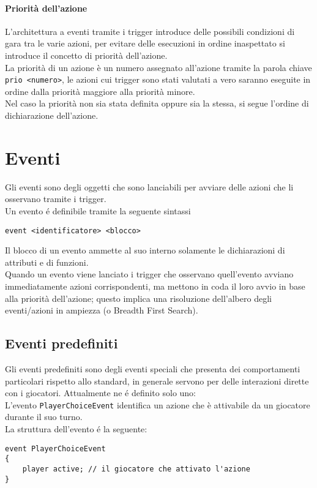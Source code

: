 \paragraph{Priorità dell'azione}
L'architettura a eventi tramite i trigger introduce delle possibili condizioni di gara tra le varie azioni,
per evitare delle esecuzioni in ordine inaspettato si introduce il concetto di priorità dell'azione. \\
La priorità di un azione è un numero assegnato all'azione tramite la parola chiave \verb|prio <numero>|,
le azioni cui trigger sono stati valutati a vero saranno eseguite in ordine dalla priorità maggiore
alla priorità minore. \\
Nel caso la priorità non sia stata definita oppure sia la stessa, si segue l'ordine di dichiarazione dell'azione.

\section{Eventi}
Gli eventi sono degli oggetti che sono lanciabili per avviare delle azioni che li osservano tramite i trigger. \\
Un evento é definibile tramite la seguente sintassi
\begin{lstlisting}
event <identificatore> <blocco>
\end{lstlisting}
Il blocco di un evento ammette al suo interno solamente le dichiarazioni di attributi e di funzioni. \\
Quando un evento viene lanciato i trigger che osservano quell'evento avviano immediatamente azioni corrispondenti,
ma mettono in coda il loro avvio in base alla priorità dell'azione; questo implica
una risoluzione dell'albero degli eventi/azioni in ampiezza (o Breadth First Search).

\subsection{Eventi predefiniti}
Gli eventi predefiniti sono degli eventi speciali che presenta dei comportamenti particolari rispetto 
allo standard, in generale servono per delle interazioni dirette con i giocatori.
Attualmente ne é definito solo uno: \\
L'evento \verb|PlayerChoiceEvent| identifica un azione che è attivabile da un giocatore durante il suo turno. \\
La struttura dell'evento é la seguente:
\begin{lstlisting}
event PlayerChoiceEvent
{
    player active; // il giocatore che attivato l'azione
}
\end{lstlisting}

